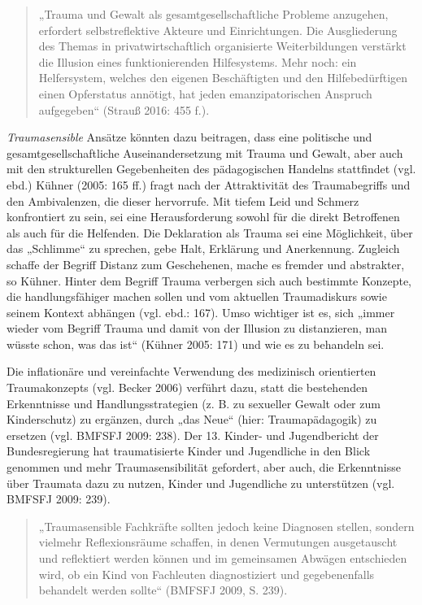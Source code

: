 \begin{quote}
\small{„Trauma und Gewalt als gesamtgesellschaftliche Probleme anzugehen, erfordert selbstreflektive Akteure und Einrichtungen. Die Ausgliederung des Themas in privatwirtschaftlich organisierte Weiterbildungen verstärkt die Illusion eines funktionierenden Hilfesystems. Mehr noch: ein Helfersystem, welches den eigenen Beschäftigten und den Hilfebedürftigen einen Opferstatus annötigt, hat jeden emanzipatorischen Anspruch aufgegeben“ (Strauß 2016: 455 f.).}
\end{quote}

\textit{Traumasensible} Ansätze könnten dazu beitragen, dass eine politische und gesamtgesellschaftliche Auseinandersetzung mit Trauma und Gewalt, aber auch mit den strukturellen Gegebenheiten des pädagogischen Handelns stattfindet (vgl. ebd.) Kühner (2005: 165 ff.) fragt nach der Attraktivität des Traumabegriffs und den Ambivalenzen, die dieser hervorrufe. Mit tiefem Leid und Schmerz konfrontiert zu sein, sei eine Herausforderung sowohl für die direkt Betroffenen als auch für die Helfenden. Die Deklaration als Trauma sei eine Möglichkeit, über das „Schlimme“ zu sprechen, gebe Halt, Erklärung und Anerkennung. Zugleich schaffe der Begriff Distanz zum Geschehenen, mache es fremder und abstrakter, so Kühner. Hinter dem Begriff Trauma verbergen sich auch bestimmte Konzepte, die handlungsfähiger machen sollen und vom aktuellen Traumadiskurs sowie seinem Kontext abhängen (vgl. ebd.: 167). Umso wichtiger ist es, sich „immer wieder vom Begriff Trauma und damit von der Illusion zu distanzieren, man wüsste schon, was das ist“ (Kühner 2005: 171) und wie es zu behandeln sei.

Die inflationäre und vereinfachte Verwendung des medizinisch orientierten Traumakonzepts (vgl. Becker 2006) verführt dazu, statt die bestehenden Erkenntnisse und Handlungsstrategien (z. B. zu sexueller Gewalt oder zum Kinderschutz) zu ergänzen, durch „das Neue“ (hier: Traumapädagogik) zu ersetzen (vgl. BMFSFJ 2009: 238). Der 13. Kinder- und Jugendbericht der Bundesregierung hat traumatisierte Kinder und Jugendliche in den Blick genommen und mehr Traumasensibilität gefordert, aber auch, die Erkenntnisse über Traumata dazu zu nutzen, Kinder und Jugendliche zu unterstützen (vgl. BMFSFJ 2009: 239).

\begin{quote}
\small{„Traumasensible Fachkräfte sollten jedoch keine Diagnosen stellen, sondern vielmehr Reflexionsräume schaffen, in denen Vermutungen ausgetauscht und reflektiert werden können und im gemeinsamen Abwägen entschieden wird, ob ein Kind von Fachleuten diagnostiziert und gegebenenfalls behandelt werden sollte“ (BMFSFJ 2009, S. 239).}
\end{quote}

